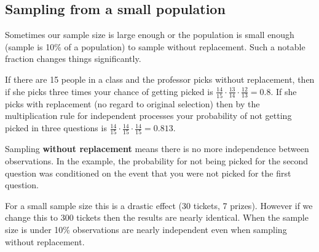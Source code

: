 \subsection{Sampling from a small population}
Sometimes our sample size is large enough or the population is small enough (sample is 10\% of a population) to sample without replacement. Such a notable fraction changes things significantly.
\begin{example}
    If there are 15 people in a class and the professor picks without replacement, then if she picks three times your chance of getting picked is $\frac{14}{15}\cdot \frac{13}{14}\cdot \frac{12}{13}=0.8$. If she picks with replacement (no regard to original selection) then by the multiplication rule for independent processes your probability of not getting picked in three questions is $\frac{14}{15}\cdot \frac{14}{15}\cdot\frac{14}{15}=0.813$.
\end{example}
Sampling \textbf{without replacement} means there is no more independence between observations. In the example, the probability for not being picked for the second question was conditioned on the event that you were not picked for the first question.

For a small sample size this is a drastic effect (30 tickets, 7 prizes). However if we change this to 300 tickets then the results are nearly identical. When the sample size is under 10\% observations are nearly independent even when sampling without replacement.


